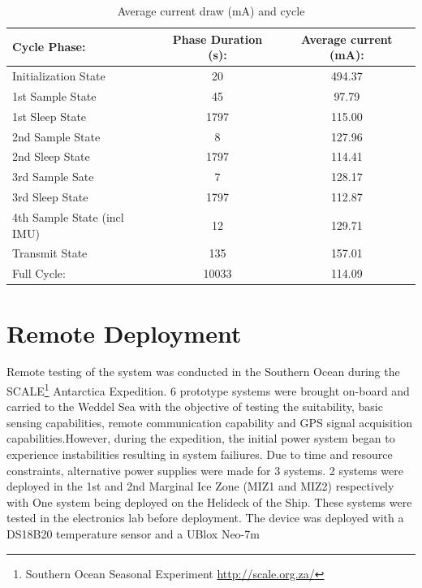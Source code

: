 \begin{table}[H]
    \centering
    \begin{tabular}{|l|c|c|}
    \hline
    \textbf{Cycle Phase: } & \textbf{Phase Duration (s):} & \textbf{Average current (mA):}\\
    \hline
     Initialization State & 20 & 494.37 \\
     \hline
     1st Sample State & 45 & 97.79 \\
     \hline 
     1st Sleep State & 1797 & 115.00 \\
     \hline
     2nd Sample State & 8 & 127.96\\
     \hline
     2nd Sleep State & 1797 & 114.41\\
     \hline
     3rd Sample Sate & 7 & 128.17\\
     \hline
     3rd Sleep State & 1797 & 112.87\\
     \hline
     4th Sample State (incl IMU) & 12  &129.71 \\
     \hline
     Transmit State & 135 & 157.01 \\
     \hline
     \hline
     Full Cycle:    & 10033 & 114.09 \\
     \hline
     \hline
    \end{tabular}
    \caption{Average current draw (mA) and cycle}
    \label{tab:test_powtest_data}
\end{table}



\section{Remote Deployment}
\label{sec:ch4_remotedeployment}
Remote testing of the system was conducted in the Southern Ocean during the SCALE\footnote{Southern Ocean Seasonal Experiment \url{http://scale.org.za/}} Antarctica Expedition. 6 prototype systems were brought on-board and carried to the Weddel Sea with the objective of testing the suitability, basic sensing capabilities, remote communication capability and GPS signal acquisition capabilities.However, during the expedition, the initial power system began to experience instabilities resulting in system failiures. Due to time and resource constraints, alternative power supplies were made for 3 systems. 2 systems were deployed in the 1st and 2nd Marginal Ice Zone (MIZ1 and MIZ2) respectively with One system being deployed on the Helideck of the Ship. These systems were tested in the electronics lab before deployment. The device was deployed with a DS18B20 temperature sensor and a UBlox Neo-7m 

